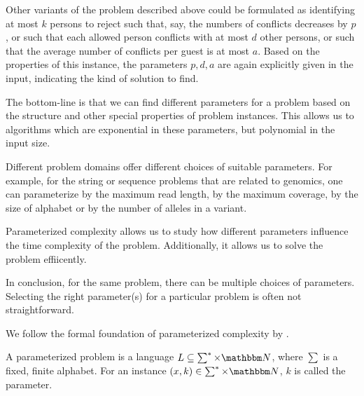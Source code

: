 Other variants of the problem described above could be formulated as identifying at most $k$ persons to reject such that,
say, the numbers of conflicts decreases by $p$, or such that each allowed person conflicts with at most $d$ other persons,
or such that the average number of conflicts per guest is at most $a$. Based on the properties of this instance, the parameters $p, d, a$ are again explicitly given in the input,
indicating the kind of solution to find. 

The bottom-line is that we can find different parameters for a problem based on the structure and other special properties of problem instances.
This allows us to algorithms which are exponential in these parameters, but polynomial in the input size.

Different problem domains offer different choices of suitable parameters. For example, 
for the string or sequence problems that are related to genomics, one can parameterize by the maximum read length, by the maximum coverage,
by the size of alphabet or by the number of alleles in a variant.

Parameterized complexity allows us to study how different parameters influence the time complexity of the problem.
Additionally, it allows us to solve the problem effiicently.

In conclusion, for the same problem, there can be multiple choices of parameters. 
Selecting the right parameter(s) for a particular problem is often not straightforward.

We follow the formal foundation of parameterized complexity by \cite{cygan2015parameterized}.

\begin{definition}
 A parameterized problem is a language $L \subseteq \sum^* \times \N$, where $\sum$ is a fixed, finite alphabet. For an instance $(x,k) \in \sum^* \times \N$, $k$ is called the parameter.
\end{definition}



